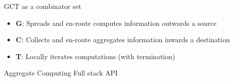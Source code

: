 \documentclass[8pt, aspectratio=169, handout]{beamer}
\begin{document}
\begin{frame}{GCT as a combinator set}
  \centering
  \begin{cardTiny}
    \begin{itemize}
      \item \textbf{G}: Spreads and en-route computes information outwards a source
      \item \textbf{C}: Collects and en-route aggregates information inwards a destination
      \item \textbf{T}: Locally iterates computations (with termination)
    \end{itemize}
  \end{cardTiny}
\end{frame}
\begin{frame}{Aggregate Computing Full stack API}
  \centering
\end{frame}
\end{document}
